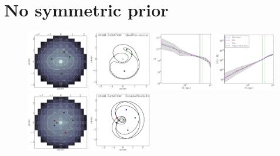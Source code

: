 \documentclass[galley,usenatbib]{mn2e}
\begin{document}
\section{No symmetric prior}
\begin{figure}
\includegraphics[width=0.24\textwidth]{BCQuadR1a-nosymm_Tms-kappa.pdf}
\includegraphics[width=0.24\textwidth]{BCQuadR1a-nosymm_Tms-a.pdf}
\includegraphics[width=0.24\textwidth]{BCQuadR1a-nosymm_Tms-b.pdf}
\includegraphics[width=0.24\textwidth]{BCQuadR1a-nosymm_Tms-c.pdf} \\
\includegraphics[width=0.24\textwidth]{BCExtendedDoubleR1-nosymm_tms-kappa.pdf}
\includegraphics[width=0.24\textwidth]{BCExtendedDoubleR1-nosymm_tms-a.pdf}

\end{figure}
\end{document}
